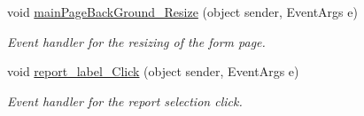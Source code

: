 \begin{DoxyCompactItemize}
void \hyperlink{classWildlifeTrackingApp_1_1MainPage_ab8756fc3263bdfbe17a118374ab779bc}{main\+Page\+Back\+Ground\+\_\+\+Resize} (object sender, Event\+Args e)
\begin{DoxyCompactList}\small\item\em Event handler for the resizing of the form page. \end{DoxyCompactList}\item 
void \hyperlink{classWildlifeTrackingApp_1_1MainPage_aca7c119833ad4525022a07c4b036e800}{report\+\_\+label\+\_\+\+Click} (object sender, Event\+Args e)
\begin{DoxyCompactList}\small\item\em Event handler for the report selection click. \end{DoxyCompactList}\end{DoxyCompactItemize}
